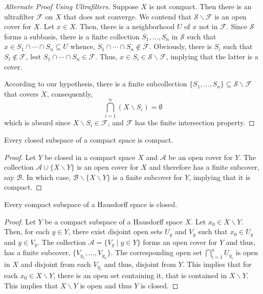 \begin{proof}[Alternate Proof Using Ultrafilters]
    Suppose $X$ is not compact. Then there is an ultrafilter $\mathscr F$ on $X$ that does not converge. We contend that $\mathcal S\backslash\mathscr F$ is an open cover for $X$. Let $x\in X$. Then, there is a neighborhood $U$ of $x$ not in $\mathscr F$. Since $\mathcal S$ forms a subbasis, there is a finite collection $S_1,\ldots,S_n$ in $\mathcal S$ such that $x\in S_1\cap\cdots\cap S_n\subseteq U$ whence, $S_1\cap\cdots\cap S_n\notin\mathscr F$. Obviously, there is $S_i$ such that $S_i\notin\mathscr F$, lest $S_1\cap\cdots\cap S_n\in\mathscr F$. Thus, $x\in S_i\in\mathcal S\backslash\mathscr F$, implying that the latter is a cover.

    According to our hypothesis, there is a finite subcollection $\{S_1,\ldots,S_n\}\subseteq\mathcal S\backslash\mathscr F$ that covers $X$, consequently, 
    \begin{equation*}
        \bigcap_{i = 1}^n(X\backslash S_i) = \emptyset
    \end{equation*}
    which is absurd since $X\backslash S_i\in\mathscr F$, and $\mathscr F$ has the finite intersection property.
\end{proof}

\begin{theorem}
    Every closed subspace of a compact space is compact.
\end{theorem}
\begin{proof}
    Let $Y$ be closed in a compact space $X$ and $\mathscr{A}$ be an open cover for $Y$. The collection $\mathscr{A}\cup\{X\backslash Y\}$ is an open cover for $X$ and therefore has a finite subcover, say $\mathscr{B}$. In which case, $\mathscr{B}\backslash\{X\backslash Y\}$ is a finite subcover for $Y$, implying that it is compact.
\end{proof}

\begin{theorem}
    Every compact subspace of a Hausdorff space is closed.
\end{theorem}
\begin{proof}
    Let $Y$ be a compact subspace of a Hausdorff space $X$. Let $x_0\in X\backslash Y$. Then, for each $y\in Y$, there exist disjoint open sets $U_y$ and $V_y$ such that $x_0\in U_y$ and $y\in V_y$. The collection $\mathscr{A} = \{V_y\mid y\in Y\}$ forms an open cover for $Y$ and thus, has a finite subcover, $\{V_{y_1},\ldots,V_{y_n}\}$. The corresponding open set $\bigcap_{i=1}^n U_{y_i}$ is open in $X$ and disjoint from each $V_{y_i}$ and thus, disjoint from $Y$. This implies that for each $x_0\in X\backslash Y$, there is an open set containing it, that is contained in $X\backslash Y$. This implies that $X\backslash Y$ is open and thus $Y$ is closed.
\end{proof}

